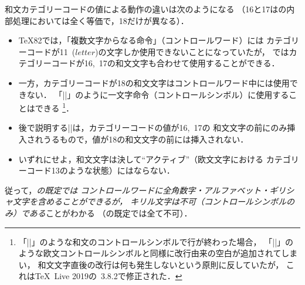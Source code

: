 \documentclass[a4paper,11pt,nomag,dvipdfmx]{jsarticle}
\begin{document}
和文カテゴリーコードの値による動作の違いは次のようになる
（16と17は\pTeX の内部処理においては全く等価で，18だけが異なる）．
\begin{itemize}
  \item \TeX82では，「複数文字からなる命令」（コントロールワード）には
    カテゴリーコードが11~($\mathit{letter}$)の文字しか使用できないことになっていたが，
    \pTeX ではカテゴリーコードが16,~17の和文文字も合わせて使用することができる．
  \item 一方，カテゴリーコードが18の和文文字はコントロールワード中には使用できない．
    「|\】|」のように一文字命令（コントロールシンボル）に使用することはできる
    \footnote{「|\】|」のような和文のコントロールシンボルで行が終わった場合，
    「|\!|」のような欧文コントロールシンボルと同様に改行由来の空白が追加されてしまい，
    和文文字直後の改行は何も発生しないという原則に反していたが，
    これは\TeX~Live 2019の\pTeX~3.8.2で修正された\cite{tjb37}．}．
  \item 後で説明する|\jcharwidowpenalty|は，カテゴリーコードの値が16,~17の
    和文文字の前にのみ挿入されうるもので，値が18の和文文字の前には挿入されない．
  \item いずれにせよ，和文文字は決して“アクティブ”（欧文文字における
    カテゴリーコード13のような状態）にはならない．
\end{itemize}
従って，\emph{\pTeX の既定では
コントロールワードに全角数字・アルファベット・ギリシャ文字を含めることができるが，
キリル文字は不可（コントロールシンボルのみ）である}ことがわかる
（\upTeX の既定では全て不可）．

\medskip
\end{document}
